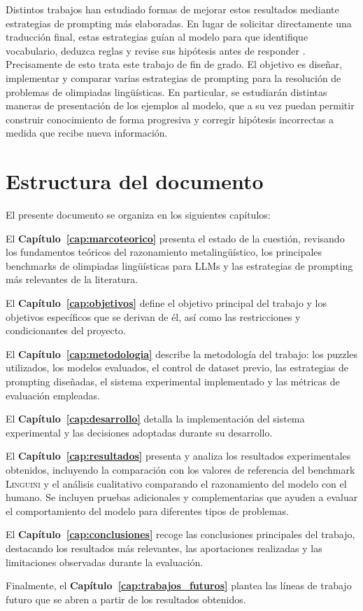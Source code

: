 Distintos trabajos han estudiado formas de mejorar estos resultados mediante estrategias de prompting más elaboradas. En lugar de solicitar directamente una traducción final, estas estrategias guían al modelo para que identifique vocabulario, deduzca reglas y revise sus hipótesis antes de responder \citep{wei2022chain,zhu2025evaluating,madaan2023selfrefine}. Precisamente de esto trata este trabajo de fin de grado. El objetivo es diseñar, implementar y comparar varias estrategias de prompting para la resolución de problemas de olimpiadas lingüísticas. En particular, se estudiarán distintas maneras de presentación de los ejemplos al modelo, que a su vez puedan permitir construir conocimiento de forma progresiva y corregir hipótesis incorrectas a medida que recibe nueva información.

\section{Estructura del documento}

El presente documento se organiza en los siguientes capítulos:

El \textbf{Capítulo~\ref{cap:marcoteorico}} presenta el estado de la cuestión, revisando los fundamentos teóricos del razonamiento metalingüístico, los principales benchmarks de olimpiadas lingüísticas para LLMs y las estrategias de prompting más relevantes de la literatura.

El \textbf{Capítulo~\ref{cap:objetivos}} define el objetivo principal del trabajo y los objetivos específicos que se derivan de él, así como las restricciones y condicionantes del proyecto.

El \textbf{Capítulo~\ref{cap:metodologia}} describe la metodología del trabajo: los puzzles utilizados, los modelos evaluados, el control de dataset previo, las estrategias de prompting diseñadas, el sistema experimental implementado y las métricas de evaluación empleadas.

El \textbf{Capítulo~\ref{cap:desarrollo}} detalla la implementación del sistema experimental y las decisiones adoptadas durante su desarrollo.

El \textbf{Capítulo~\ref{cap:resultados}} presenta y analiza los resultados experimentales obtenidos, incluyendo la comparación con los valores de referencia del benchmark \textsc{Linguini} \citep{sanchez2024linguini} y el análisis cualitativo comparando el razonamiento del modelo con el humano. Se incluyen pruebas adicionales y complementarias que ayuden a evaluar el comportamiento del modelo para diferentes tipos de problemas.

El \textbf{Capítulo~\ref{cap:conclusiones}} recoge las conclusiones principales del trabajo, destacando los resultados más relevantes, las aportaciones realizadas y las limitaciones observadas durante la evaluación.
 
Finalmente, el \textbf{Capítulo~\ref{cap:trabajos_futuros}} plantea las líneas de trabajo futuro que se abren a partir de los resultados obtenidos.